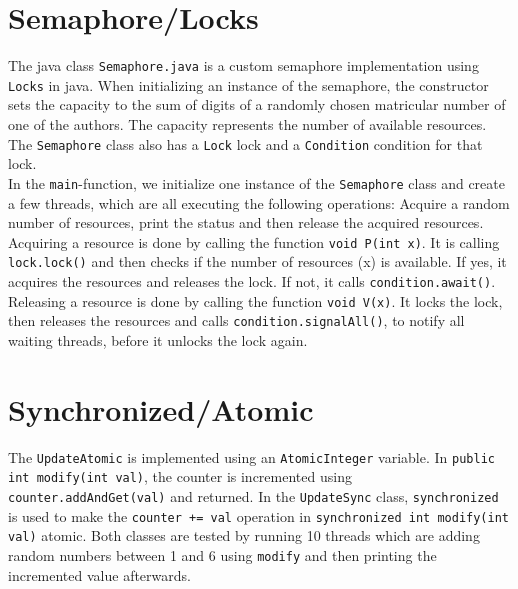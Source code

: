 \documentclass{article}
\begin{document}
  \section{Semaphore/Locks}

    The java class \texttt{Semaphore.java} is a custom semaphore implementation using \texttt{Locks} in java. When initializing an instance of the semaphore, the constructor sets the capacity to the sum of digits of a randomly chosen matricular number of one of the authors. The capacity represents the number of available resources. The \texttt{Semaphore} class also has a \texttt{Lock} lock and a \texttt{Condition} condition for that lock.\\
    In the \texttt{main}-function, we initialize one instance of the \texttt{Semaphore} class and create a few threads, which are all executing the following operations: Acquire a random number of resources, print the status and then release the acquired resources.\\
    Acquiring a resource is done by calling the function \texttt{void P(int x)}. It is calling \texttt{lock.lock()} and then checks if the number of resources (x) is available. If yes, it acquires the resources and releases the lock. If not, it calls \texttt{condition.await()}. Releasing a resource is done by calling the function \texttt{void V(x)}. It locks the lock, then releases the resources and calls \texttt{condition.signalAll()}, to notify all waiting threads, before it unlocks the lock again.

  \section{Synchronized/Atomic}

    The \texttt{UpdateAtomic} is implemented using an \texttt{AtomicInteger} variable. In \texttt{public int modify(int val)}, the counter is incremented using \texttt{counter.addAndGet(val)} and returned. In the \texttt{UpdateSync} class, \texttt{synchronized} is used to make the \texttt{counter += val} operation in \texttt{synchronized int modify(int val)} atomic. Both classes are tested by running 10 threads which are adding random numbers between 1 and 6 using \texttt{modify} and then printing the incremented value afterwards.
\end{document}
